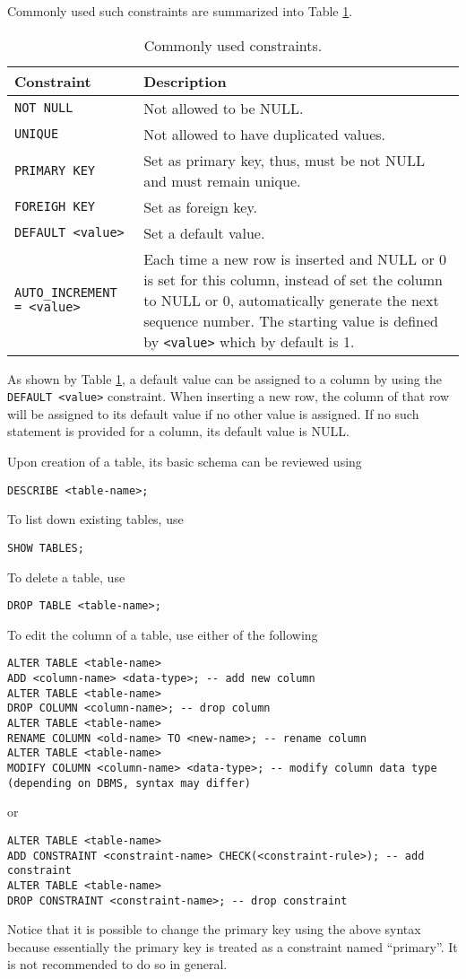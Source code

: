 Commonly used such constraints are summarized into Table \ref{ch:db:tab:constraints}.
\begin{table}
	\centering \caption{Commonly used constraints.}\label{ch:db:tab:constraints}
	\begin{tabularx}{\textwidth}{lX}
		\hline
		Constraint & Description \\ \hline
		\verb|NOT NULL| & Not allowed to be NULL. \\ 
		\verb|UNIQUE| & Not allowed to have duplicated values. \\ 
        \verb|PRIMARY KEY| & Set as primary key, thus, must be not NULL and must remain unique. \\ 
        \verb|FOREIGH KEY| & Set as foreign key. \\ 
        \verb|DEFAULT <value>| & Set a default value. \\ 
        \verb|AUTO_INCREMENT = <value>| & Each time a new row is inserted and NULL or 0 is set for this column, instead of set the column to NULL or 0, automatically generate the next sequence number. The starting value is defined by \verb|<value>| which by default is 1. \\
		 \hline
	\end{tabularx}
\end{table}
As shown by Table \ref{ch:db:tab:constraints}, a default value can be assigned to a column by using the \verb|DEFAULT <value>| constraint. When inserting a new row, the column of that row will be assigned to its default value if no other value is assigned. If no such statement is provided for a column, its default value is NULL.

Upon creation of a table, its basic schema can be reviewed using
\begin{lstlisting}
DESCRIBE <table-name>;
\end{lstlisting}
To list down existing tables, use
\begin{lstlisting}
SHOW TABLES;
\end{lstlisting}
To delete a table, use
\begin{lstlisting}
DROP TABLE <table-name>;
\end{lstlisting}

To edit the column of a table, use either of the following
\begin{lstlisting}
ALTER TABLE <table-name>
ADD <column-name> <data-type>; -- add new column
ALTER TABLE <table-name>
DROP COLUMN <column-name>; -- drop column
ALTER TABLE <table-name>
RENAME COLUMN <old-name> TO <new-name>; -- rename column
ALTER TABLE <table-name>
MODIFY COLUMN <column-name> <data-type>; -- modify column data type (depending on DBMS, syntax may differ)
\end{lstlisting}
or
\begin{lstlisting}
ALTER TABLE <table-name>
ADD CONSTRAINT <constraint-name> CHECK(<constraint-rule>); -- add constraint
ALTER TABLE <table-name>
DROP CONSTRAINT <constraint-name>; -- drop constraint
\end{lstlisting}
Notice that it is possible to change the primary key using the above syntax because essentially the primary key is treated as a constraint named ``primary''. It is not recommended to do so in general.

